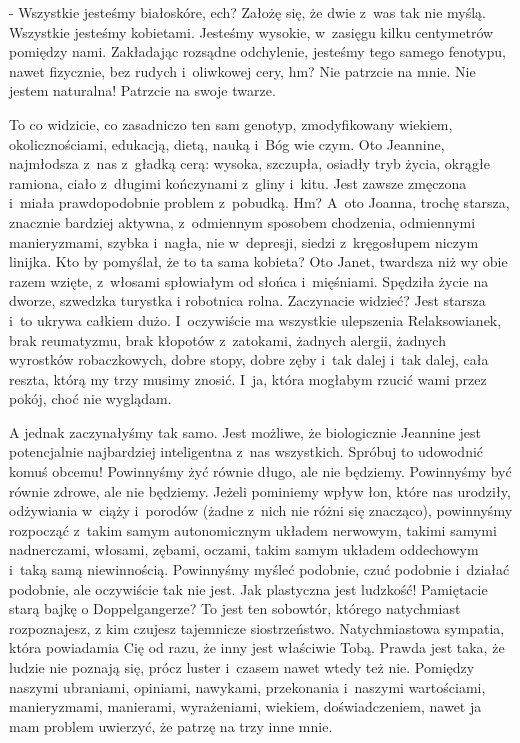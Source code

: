 \documentclass[oneside,polish,12pt,sfheadings]{mwbk}
\begin{document}
- Wszystkie jesteśmy białoskóre, ech? Założę się, że dwie z~was tak
nie myślą. Wszystkie jesteśmy kobietami. Jesteśmy wysokie, w~zasięgu
kilku centymetrów pomiędzy nami. Zakładając rozsądne odchylenie, jesteśmy
tego samego fenotypu, nawet fizycznie, bez rudych i~oliwkowej cery,
hm? Nie patrzcie na mnie. Nie jestem naturalna! Patrzcie na swoje
twarze.

To co widzicie, co zasadniczo ten sam genotyp, zmodyfikowany wiekiem,
okolicznościami, edukacją, dietą, nauką i~Bóg wie czym. Oto Jeannine,
najmłodsza z~nas z~gładką cerą: wysoka, szczupła, osiadły tryb życia,
okrągłe ramiona, ciało z~długimi kończynami z~gliny i~kitu. Jest
zawsze zmęczona i~miała prawdopodobnie problem z~pobudką. Hm? A~oto
Joanna, trochę starsza, znacznie bardziej aktywna, z~odmiennym sposobem
chodzenia, odmiennymi manieryzmami, szybka i~nagła, nie w~depresji,
siedzi z~kręgosłupem niczym linijka. Kto by pomyślał, że to ta sama
kobieta? Oto Janet, twardsza niż wy obie razem wzięte, z~włosami spłowiałym
od słońca i~mięśniami. Spędziła życie na dworze, szwedzka turystka
i robotnica rolna. Zaczynacie widzieć? Jest starsza i~to ukrywa całkiem
dużo. I~oczywiście ma wszystkie ulepszenia Relaksowianek, brak reumatyzmu,
brak kłopotów z~zatokami, żadnych alergii, żadnych wyrostków robaczkowych,
dobre stopy, dobre zęby i~tak dalej i~tak dalej, cała reszta, którą
my trzy musimy znosić. I~ja, która mogłabym rzucić wami przez pokój,
choć nie wyglądam.

A jednak zaczynałyśmy tak samo. Jest możliwe, że biologicznie Jeannine
jest potencjalnie najbardziej inteligentna z~nas wszystkich. Spróbuj
to udowodnić komuś obcemu! Powinnyśmy żyć równie długo, ale nie będziemy.
Powinnyśmy być równie zdrowe, ale nie będziemy. Jeżeli pominiemy wpływ
łon, które nas urodziły, odżywiania w~ciąży i~porodów (żadne z~nich
nie różni się znacząco), powinnyśmy rozpocząć z~takim samym autonomicznym
układem nerwowym, takimi samymi nadnerczami, włosami, zębami, oczami,
takim samym układem oddechowym i~taką samą niewinnością. Powinnyśmy
myśleć podobnie, czuć podobnie i~działać podobnie, ale oczywiście
tak nie jest. Jak plastyczna jest ludzkość! Pamiętacie starą bajkę
o Doppelgangerze? To jest ten sobowtór, którego natychmiast rozpoznajesz,
z kim czujesz tajemnicze siostrzeństwo. Natychmiastowa sympatia, która
powiadamia Cię od razu, że inny jest właściwie Tobą. Prawda jest taka,
że ludzie nie poznają się, prócz luster i~czasem nawet wtedy też nie.
Pomiędzy naszymi ubraniami, opiniami, nawykami, przekonania i~naszymi
wartościami, manieryzmami, manierami, wyrażeniami, wiekiem, doświadczeniem,
nawet ja mam problem uwierzyć, że patrzę na trzy inne mnie.
\end{document}
